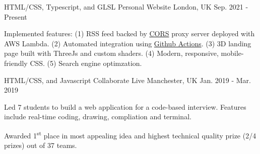 

\begin{cventries}

  \cventry
    {HTML/CSS, Typescript, and GLSL} %
    {Personal Website} %
    {London, UK} %
    {Sep. 2021 - Present} %
    {
      \begin{cvitems} %
        \item {Implemented features: (1) RSS feed backed by \href{https://developer.mozilla.org/en-US/docs/Web/HTTP/CORS}{CORS} proxy server deployed with AWS Lambda. (2) Automated integration using \href{https://github.com/features/actions}{Github Actions}. (3) 3D landing page built with ThreeJs and custom shaders. (4) Modern, responsive, mobile-friendly CSS. (5) Search engine optimzation.}
      \end{cvitems}
    }


    \cventry
    {HTML/CSS, and Javascript} %
    {Collaborate Live} %
    {Manchester, UK} %
    {Jan. 2019 - Mar. 2019} %
    {
      \begin{cvitems} %
        \item {Led 7 students to build a web application for a code-based interview. Features include real-time coding, drawing, compliation and terminal.}
        \item {Awarded 1\textsuperscript{st} place in most appealing idea and highest technical quality prize (2/4 prizes) out of 37 teams.}
      \end{cvitems}
    }


\end{cventries}
